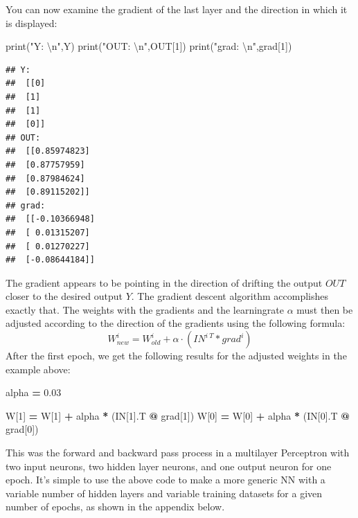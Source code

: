 \documentclass[
]{book}
\newenvironment{Shaded}{\begin{snugshade}}{\end{snugshade}}
\newcommand{\BuiltInTok}[1]{#1}
\newcommand{\CharTok}[1]{\textcolor[rgb]{0.31,0.60,0.02}{#1}}
\newcommand{\DecValTok}[1]{\textcolor[rgb]{0.00,0.00,0.81}{#1}}
\newcommand{\FloatTok}[1]{\textcolor[rgb]{0.00,0.00,0.81}{#1}}
\newcommand{\NormalTok}[1]{#1}
\newcommand{\OperatorTok}[1]{\textcolor[rgb]{0.81,0.36,0.00}{\textbf{#1}}}
\newcommand{\StringTok}[1]{\textcolor[rgb]{0.31,0.60,0.02}{#1}}
\begin{document}
You can now examine the gradient of the last layer and the direction in which it is displayed:

\begin{Shaded}
\begin{Highlighting}[]
\BuiltInTok{print}\NormalTok{(}\StringTok{"Y: }\CharTok{\textbackslash{}n}\StringTok{"}\NormalTok{,Y)}
\BuiltInTok{print}\NormalTok{(}\StringTok{"OUT: }\CharTok{\textbackslash{}n}\StringTok{"}\NormalTok{,OUT[}\DecValTok{1}\NormalTok{])}
\BuiltInTok{print}\NormalTok{(}\StringTok{"grad: }\CharTok{\textbackslash{}n}\StringTok{"}\NormalTok{,grad[}\DecValTok{1}\NormalTok{])}
\end{Highlighting}
\end{Shaded}

\begin{verbatim}
## Y: 
##  [[0]
##  [1]
##  [1]
##  [0]]
## OUT: 
##  [[0.85974823]
##  [0.87757959]
##  [0.87984624]
##  [0.89115202]]
## grad: 
##  [[-0.10366948]
##  [ 0.01315207]
##  [ 0.01270227]
##  [-0.08644184]]
\end{verbatim}

The gradient appears to be pointing in the direction of drifting the output \(OUT\) closer to the desired output \(Y\). The gradient descent algorithm accomplishes exactly that.
The weights with the gradients and the learningrate \(\alpha\) must then be adjusted according to the direction of the gradients using the following formula:
\[
  W^i_{new} = W^i_{old} + \alpha \cdot ( IN^{i\ T} * grad^i) 
\]
After the first epoch, we get the following results for the adjusted weights in the example above:

\begin{Shaded}
\begin{Highlighting}[]
\NormalTok{alpha }\OperatorTok{=} \FloatTok{0.03}

\NormalTok{W[}\DecValTok{1}\NormalTok{] }\OperatorTok{=}\NormalTok{ W[}\DecValTok{1}\NormalTok{] }\OperatorTok{+}\NormalTok{ alpha }\OperatorTok{*}\NormalTok{ (IN[}\DecValTok{1}\NormalTok{].T }\OperatorTok{@}\NormalTok{ grad[}\DecValTok{1}\NormalTok{]) }
\NormalTok{W[}\DecValTok{0}\NormalTok{] }\OperatorTok{=}\NormalTok{ W[}\DecValTok{0}\NormalTok{] }\OperatorTok{+}\NormalTok{ alpha }\OperatorTok{*}\NormalTok{ (IN[}\DecValTok{0}\NormalTok{].T }\OperatorTok{@}\NormalTok{ grad[}\DecValTok{0}\NormalTok{]) }
\end{Highlighting}
\end{Shaded}

This was the forward and backward pass process in a multilayer Perceptron with two input neurons, two hidden layer neurons, and one output neuron for one epoch. It's simple to use the above code to make a more generic NN with a variable number of hidden layers and variable training datasets for a given number of epochs, as shown in the appendix below.
\end{document}
